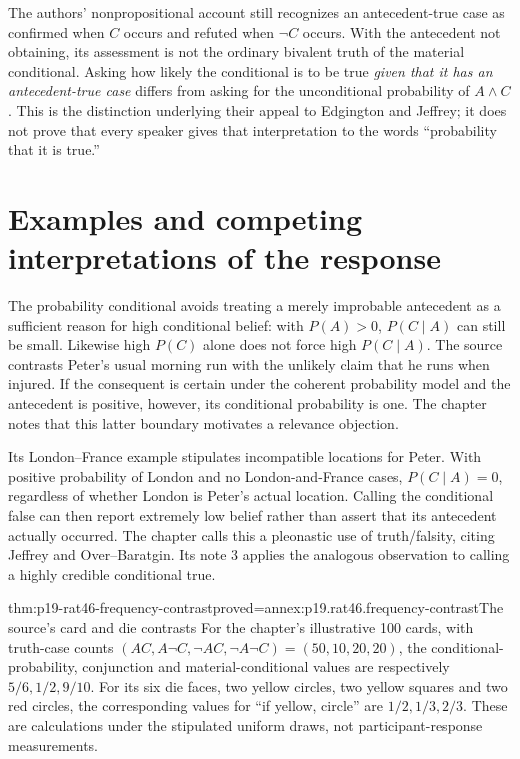 The authors' nonpropositional account still recognizes an antecedent-true
case as confirmed when \(C\) occurs and refuted when \(\neg C\)
occurs. With the antecedent not obtaining, its assessment is not the
ordinary bivalent truth of the material conditional. Asking how likely
the conditional is to be true \emph{given that it has an antecedent-true
case} differs from asking for the unconditional probability of
\(A\land C\). This is the distinction underlying their appeal to
Edgington and Jeffrey; it does not prove that every speaker gives that
interpretation to the words ``probability that it is true.''

\section{Examples and competing interpretations of the response}
\label{sec:p19-rat46-interpretations}

The probability conditional avoids treating a merely improbable antecedent
as a sufficient reason for high conditional belief: with \(P(A)>0\),
\(P(C\mid A)\) can still be small. Likewise high \(P(C)\) alone does
not force high \(P(C\mid A)\). The source contrasts Peter's usual
morning run with the unlikely claim that he runs when injured. If the
consequent is certain under the coherent probability model and the
antecedent is positive, however, its conditional probability is one.
The chapter notes that this latter boundary motivates a relevance objection.

Its London--France example stipulates incompatible locations for Peter.
With positive probability of London and no London-and-France cases,
\(P(C\mid A)=0\), regardless of whether London is Peter's actual
location. Calling the conditional false can then report extremely low
belief rather than assert that its antecedent actually occurred. The
chapter calls this a pleonastic use of truth/falsity, citing Jeffrey and
Over--Baratgin. Its note 3 applies the analogous observation to calling
a highly credible conditional true.

\begin{hbtheorem}{thm:p19-rat46-frequency-contrast}{proved=annex:p19.rat46.frequency-contrast}{The source's card and die contrasts}
For the chapter's illustrative 100 cards, with truth-case counts
\((A C,A\neg C,\neg A C,\neg A\neg C)=(50,10,20,20)\),
the conditional-probability, conjunction and material-conditional
values are respectively \(5/6,1/2,9/10\).
For its six die faces, two yellow circles, two yellow squares and two
red circles, the corresponding values for ``if yellow, circle'' are
\(1/2,1/3,2/3\). These are calculations under the stipulated uniform
draws, not participant-response measurements.
\end{hbtheorem}

